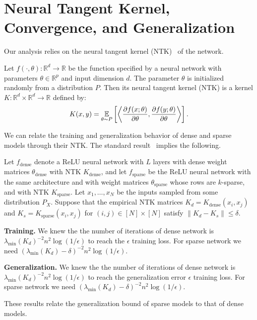 \section{Neural Tangent Kernel, Convergence, and Generalization}
\label{sec:appx_ntk}

Our analysis relies on the neural tangent kernel (NTK)~\citep{jacot2018neural} of the network.
\begin{definition}
  Let $f(\cdot, \theta) \colon \mathbb{R}^{d} \to \mathbb{R}$ be the function specified by a neural network with parameters $\theta \in \mathbb{R}^p$ and input dimension $d$.
  The parameter $\theta$ is initialized randomly from a distribution $P$.
  Then its neural tangent kernel (NTK) \citep{jacot2018neural} is a kernel $K \colon \mathbb{R}^{d} \times \mathbb{R}^{d} \to \mathbb{R}$ defined by:
  \begin{equation*}\label{eq:kernel}
    K(x, y) = \operatorname*{{\mathbb{E}}}_{\theta \sim P} \left[ \left\langle \frac{\partial f(x; \theta)}{\partial \theta}, \frac{\partial f(y; \theta) }{\partial \theta} \right\rangle\right].
  \end{equation*}
\end{definition}

We can relate the training and generalization behavior of dense and sparse
models through their NTK.
The standard result~\citep{sy19} implies the following.
\begin{proposition}
  \label{thm:ntk}
  Let $f_\mathrm{dense}$ denote a ReLU neural network with $L$ layers with dense weight matrices $\theta_\mathrm{dense}$ with NTK $K_\mathrm{dense}$, and let $f_\mathrm{sparse}$ be the ReLU neural network with the same architecture and with weight matrices $\theta_\mathrm{sparse}$ whose rows are $k$-sparse, and with NTK $K_\mathrm{sparse}$.
  Let $x_1, \dots, x_N$ be the inputs sampled from some distribution $P_X$.
  Suppose that the empirical NTK matrices $K_d = K_\mathrm{dense}(x_i, x_j)$ and $K_s = K_\mathrm{sparse}(x_i, x_j)$ for $(i, j) \in [N] \times [N]$ satisfy $\| K_d - K_s \| \leq \delta$.

  {\bf Training.}
  We knew the the number of iterations of dense network is $\lambda_{\min}(K_d)^{-2} n^2 \log(1/\epsilon)$ to reach the $\epsilon$ training loss. For sparse network we need $(\lambda_{\min}(K_d) -\delta)^{-2} n^2 \log(1/\epsilon)$.

  {\bf Generalization.}
  We knew the the number of iterations of dense network is $\lambda_{\min}(K_d)^{-2} n^2 \log(1/\epsilon)$ to reach the generalization error $\epsilon$ training loss. For sparse network we need $(\lambda_{\min}(K_d) -\delta)^{-2} n^2 \log(1/\epsilon)$.
\end{proposition}
These results relate the generalization bound of sparse models to that of dense models.